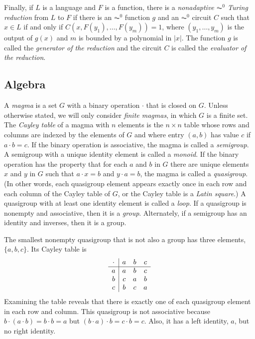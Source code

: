 Finally, if $L$ is a language and $F$ is a function, there is a \emph{nonadaptive $\AC^0$ Turing reduction} from $L$ to $F$ if there is an $\AC^0$ function $g$ and an $\AC^0$ circuit $C$ such that $x \in L$ if and only if $C(x, F(y_1), \dotsc, F(y_m)) = 1$, where $(y_1, \dotsc, y_m)$ is the output of $g(x)$ and $m$ is bounded by a polynomial in $|x|$.
The function $g$ is called the \emph{generator of the reduction} and the circuit $C$ is called the \emph{evaluator of the reduction}.

\subsection{Algebra}

A \emph{magma} is a set $G$ with a binary operation $\cdot$ that is closed on $G$.
Unless otherwise stated, we will only consider \emph{finite magmas}, in which $G$ is a finite set.
The \emph{Cayley table} of a magma with $n$ elements is the $n \times n$ table whose rows and columns are indexed by the elements of $G$ and where entry $(a, b)$ has value $c$ if $a \cdot b = c$.
If the binary operation is associative, the magma is called a \emph{semigroup}.
A semigroup with a unique identity element is called a \emph{monoid}.
If the binary operation has the property that for each $a$ and $b$ in $G$ there are unique elements $x$ and $y$ in $G$ such that $a \cdot x = b$ and $y \cdot a = b$, the magma is called a \emph{quasigroup}.
(In other words, each quasigroup element appears exactly once in each row and each column of the Cayley table of $G$, or the Cayley table is a \emph{Latin square}.)
A quasigroup with at least one identity element is called a \emph{loop}.
If a quasigroup is nonempty and associative, then it is a \emph{group}.
Alternately, if a semigroup has an identity and inverses, then it is a group.

\begin{example}\label{ex:quasigroup}
  The smallest nonempty quasigroup that is not also a group has three elements, $\{a, b, c\}$.
  Its Cayley table is
  \begin{equation*}
    \begin{array}{c | c c c}
      \cdot & a & b & c \\
      \hline
      a & a & b & c \\
      b & c & a & b \\
      c & b & c & a \\
    \end{array}
  \end{equation*}
  Examining the table reveals that there is exactly one of each quasigroup element in each row and column.
  This quasigroup is not associative because $b \cdot (a \cdot b) = b \cdot b = a$ but $(b \cdot a) \cdot b = c \cdot b = c$.
  Also, it has a left identity, $a$, but no right identity.
\end{example}

